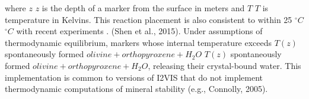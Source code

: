 \documentclass[draft,linenumbers]{agujournal2018} %
\providecommand{\DIFaddtex}[1]{{\protect\color{blue} \sf #1}} %
\providecommand{\DIFdeltex}[1]{{\protect\color{red} \scriptsize #1}} %
\providecommand{\DIFaddbegin}{} %
\providecommand{\DIFaddend}{} %
\providecommand{\DIFdelbegin}{} %
\providecommand{\DIFdelend}{} %
\providecommand{\DIFadd}[1]{\texorpdfstring{\DIFaddtex{#1}}{#1}} %
\providecommand{\DIFdel}[1]{\texorpdfstring{\DIFdeltex{#1}}{}} %
\newcommand{\DIFscaledelfig}{0.3}
\newlength{\DIFdelgraphicswidth} %
\newlength{\DIFdelgraphicsheight} %
\newcommand{\DIFaddincludegraphics}[2][]{{\color{blue}\fbox{\DIFOincludegraphics[#1]{#2}}}} %
\newcommand{\DIFdelincludegraphics}[2][]{%
\sbox{\DIFdelgraphicsbox}{\DIFOincludegraphics[#1]{#2}}%
\settoboxwidth{\DIFdelgraphicswidth}{\DIFdelgraphicsbox} %
\settoboxtotalheight{\DIFdelgraphicsheight}{\DIFdelgraphicsbox} %
\scalebox{\DIFscaledelfig}{%
\parbox[b]{\DIFdelgraphicswidth}{\usebox{\DIFdelgraphicsbox}\\[-\baselineskip] \rule{\DIFdelgraphicswidth}{0em}}\llap{\resizebox{\DIFdelgraphicswidth}{\DIFdelgraphicsheight}{%
\setlength{\unitlength}{\DIFdelgraphicswidth}%
\begin{picture}(1,1)%
\thicklines\linethickness{2pt} %
{\color[rgb]{1,0,0}\put(0,0){\framebox(1,1){}}}%
{\color[rgb]{1,0,0}\put(0,0){\line( 1,1){1}}}%
{\color[rgb]{1,0,0}\put(0,1){\line(1,-1){1}}}%
\end{picture}%
}\hspace*{3pt}}} %
} %
\DeclareRobustCommand{\DIFaddbegin}{\DIFOaddbegin \let\includegraphics\DIFaddincludegraphics} %
\DeclareRobustCommand{\DIFaddend}{\DIFOaddend \let\includegraphics\DIFOincludegraphics} %
\DeclareRobustCommand{\DIFdelbegin}{\DIFOdelbegin \let\includegraphics\DIFdelincludegraphics} %
\DeclareRobustCommand{\DIFdelend}{\DIFOaddend \let\includegraphics\DIFOincludegraphics} %
\begin{document}
where \DIFdelbegin \DIFdel{$z$ }\DIFdelend \DIFaddbegin \DIFadd{\(z\) }\DIFaddend is the depth of a marker from the surface in meters and
\DIFdelbegin \DIFdel{$T$ }\DIFdelend \DIFaddbegin \DIFadd{\(T\) }\DIFaddend is temperature in Kelvins. This reaction placement is also
consistent to within 25 \DIFdelbegin \DIFdel{$^{\circ}C$ }\DIFdelend \DIFaddbegin \DIFadd{\(^{\circ}C\) }\DIFaddend with recent experiments \DIFdelbegin %
\DIFdel{.}\DIFdelend \DIFaddbegin \DIFadd{(Shen et
al., 2015). }\DIFaddend Under assumptions of thermodynamic equilibrium, markers
whose internal temperature exceeds \DIFdelbegin \DIFdel{$T(z)$  spontaneously formed
$olivine \allowbreak+ orthopyroxene \allowbreak+ H_2O$}\DIFdelend \DIFaddbegin \DIFadd{\(T(z)\) spontaneously formed
\(olivine + orthopyroxene + H_{2}O\)}\DIFaddend , releasing their crystal-bound
water. \DIFaddbegin \DIFadd{This implementation is common to versions of I2VIS that do not
implement thermodynamic computations of mineral stability (e.g.,
Connolly, 2005).
}\DIFaddend
\end{document}
